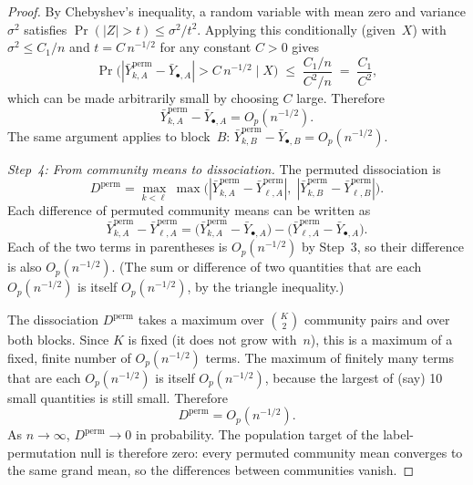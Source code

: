 \documentclass[hidelinks]{siamart251216}
\makeatletter
\let\SM@origTheTheorem\thetheorem
\newcommand{\restoretheoremnum}{\let\thetheorem\SM@origTheTheorem}
\makeatother
\begin{document}
\begin{proof}
  By Chebyshev's inequality, a random variable with mean zero and
  variance $\sigma^2$ satisfies
  $\Pr(|Z| > t) \le \sigma^2 / t^2$.  Applying this conditionally
  (given~$X$) with
  $\sigma^2 \le C_1/n$
  and $t = C\, n^{-1/2}$ for any constant $C > 0$ gives
  \[
    \Pr\!\bigl(|\bar{Y}_{k,A}^{\mathrm{perm}}
    - \bar{Y}_{\bullet,A}| > C\, n^{-1/2}
    \;\big|\; X\bigr)
    \;\le\; \frac{C_1 / n}{C^2 / n}
    \;=\; \frac{C_1}{C^2},
  \]
  which can be made arbitrarily small by choosing $C$ large.  Therefore
  \[
    \bar{Y}_{k,A}^{\mathrm{perm}} - \bar{Y}_{\bullet,A}
    = O_p(n^{-1/2}).
  \]
  The same argument applies to block~$B$:
  $\bar{Y}_{k,B}^{\mathrm{perm}} - \bar{Y}_{\bullet,B}
  = O_p(n^{-1/2})$.

  \emph{Step~4: From community means to dissociation.}
  The permuted dissociation is
  \[
    D^{\mathrm{perm}}
    = \max_{k < \ell}\,
      \max\!\bigl(
        |\bar{Y}_{k,A}^{\mathrm{perm}}
         - \bar{Y}_{\ell,A}^{\mathrm{perm}}|,\;
        |\bar{Y}_{k,B}^{\mathrm{perm}}
         - \bar{Y}_{\ell,B}^{\mathrm{perm}}|
      \bigr).
  \]
  Each difference of permuted community means can be written as
  \[
    \bar{Y}_{k,A}^{\mathrm{perm}} - \bar{Y}_{\ell,A}^{\mathrm{perm}}
    = \bigl(\bar{Y}_{k,A}^{\mathrm{perm}}
      - \bar{Y}_{\bullet,A}\bigr)
    - \bigl(\bar{Y}_{\ell,A}^{\mathrm{perm}}
      - \bar{Y}_{\bullet,A}\bigr).
  \]
  Each of the two terms in parentheses is $O_p(n^{-1/2})$ by Step~3,
  so their difference is also $O_p(n^{-1/2})$.  (The sum or difference
  of two quantities that are each $O_p(n^{-1/2})$ is itself
  $O_p(n^{-1/2})$, by the triangle inequality.)

  The dissociation $D^{\mathrm{perm}}$ takes a maximum over
  $\binom{K}{2}$ community pairs and over both blocks.  Since $K$ is
  fixed (it does not grow with~$n$), this is a maximum of a fixed,
  finite number of $O_p(n^{-1/2})$ terms.  The maximum of finitely many
  terms that are each $O_p(n^{-1/2})$ is itself $O_p(n^{-1/2})$,
  because the largest of (say) 10 small quantities is still small.
  Therefore
  \[
    D^{\mathrm{perm}} = O_p(n^{-1/2}).
  \]
  As $n \to \infty$, $D^{\mathrm{perm}} \to 0$ in probability.  The
  population target of the label-permutation null is therefore zero:
  every permuted community mean converges to the same grand mean, so
  the differences between communities vanish.
\end{proof}
\restoretheoremnum



\end{document}
